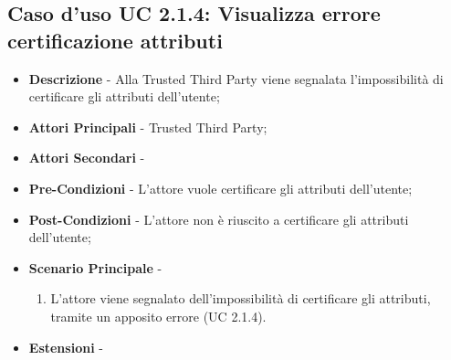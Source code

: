 \subsection{Caso d'uso UC 2.1.4: Visualizza errore certificazione attributi}
\begin{itemize}
	\item \textbf{Descrizione} - Alla Trusted Third Party viene segnalata l'impossibilità di certificare gli attributi dell'utente;
	\item \textbf{Attori Principali} - Trusted Third Party;
	\item \textbf{Attori Secondari} -
	\item \textbf{Pre-Condizioni} - L'attore vuole certificare gli attributi dell'utente;
	\item \textbf{Post-Condizioni} - L'attore non è riuscito a certificare gli attributi dell'utente;
	\item \textbf{Scenario Principale} - 
	\begin{enumerate}
		\item L'attore viene segnalato dell'impossibilità di certificare gli attributi, tramite un apposito errore (UC 2.1.4).
	\end{enumerate}
	\item \textbf{Estensioni} -
\end{itemize}
